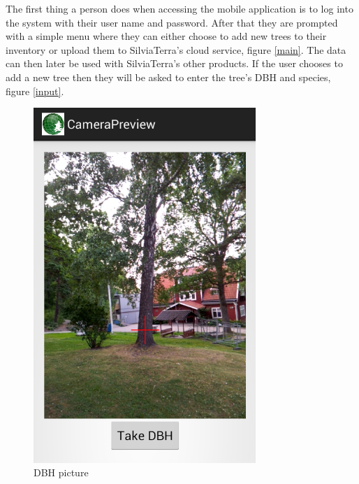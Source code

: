 The first thing a person does when accessing the mobile application is to log into the system with their user name and password. After that they are prompted with a simple menu where they can either choose to add new trees to their inventory or upload them to SilviaTerra's cloud service, figure \ref{main}. The data can then later be used with SilviaTerra's other products. If the user chooses to add a new tree then they will be asked to enter the tree's DBH and species, figure \ref{input}. 
\begin{figure}[!htb]
		\centering
  		\includegraphics[width=0.75\textwidth]{dbh.png}
	  	\caption{DBH picture}
	  	\label{dbh}
	\endminipage\hfill
		\centering

\end{figure}
